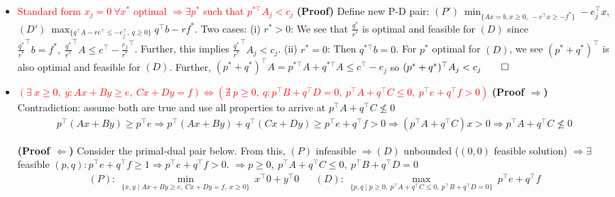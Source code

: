 \documentclass{article}
\begin{document}
\begin{itemize}
    \item \textcolor{red}{Standard form $x_j = 0\ \forall x^*$ optimal $\Rightarrow \exists p^*$ such that $p^{*\top} A_j < c_j$}
    \textbf{(Proof)} Define new P-D pair: $(P')\ \min_{\{Ax=b, x\geq0,\ -c^\top x \geq -f^*\}}-e_j^\top x$, $(D')\ \max_{\{q^\top A -rc^\top \leq -e_j^\top,\ q\geq0\}}q^\top b -rf^*$. Two cases: (i) $r^*> 0$: We see that $\tfrac{q^*}{r^*}$ is optimal and feasible for $(D)$ since $\tfrac{q^*}{r^*}^\top b = f^*,\;\tfrac{q^*}{r^*}^\top A \leq c^\top - \tfrac{e_j}{r^*}^\top$. Further, this implies $\tfrac{q^*}{r^*}^\top A_j < c_j$. (ii) $r^*=0$: Then $q^{*\top}b = 0$. For $p^*$ optimal for $(D)$, we see $(p^{*} + q^*)^\top$ is also optimal and feasible for $(D)$. Further, $(p^{*} + q^*)^\top A = p^{*\top}A + q^{*\top}A \leq c^\top - e_j$ so $(p^* + q^*)^\top A_j < c_j \qed$

    \item \textcolor{red}{$(\exists\ x\geq 0,\ y: Ax + By \geq e,\ Cx + Dy = f) \iff (\nexists\ p\geq0,\ q: p^\top B + q^\top D = 0,\ p^\top A + q^\top C \leq 0,\ p^\top e + q^\top f > 0)$}
    \textbf{(Proof $\Rightarrow$)} Contradiction: assume both are true and use all properties to arrive at $p^\top A + q^\top C \not\leq 0$
    \begin{align*}
        p^\top (Ax + By) \geq p^\top e \Longrightarrow p^\top (Ax + By) + q^\top (Cx + Dy) \geq p^\top e + q^\top f > 0 \Longrightarrow (p^\top A + q^\top C)x > 0 \Longrightarrow p^\top A + q^\top C \not\leq 0
    \end{align*}

    \textbf{(Proof $\Leftarrow$)}
    Consider the primal-dual pair below. From this, 
    $(P)$ infeasible $\Longrightarrow (D)$ unbounded ($(0,0)$ feasible solution)
    $\Longrightarrow \exists$ feasible $(p,q): p^\top e + q^\top f \geq 1 \Longrightarrow p^\top e + q^\top f > 0$. 
    $\Longrightarrow p\geq 0,\ p^\top A + q^\top C \leq 0,\ p^\top B + q^\top D = 0$
    \begin{align*}
        (P):\ \min_{\{x,y\mid Ax + By \geq e,\ Cx + Dy = f,\ x\geq 0\}}\ x^\top 0 + y^\top 0  && 
        (D):\ \max_{\{p,q\mid p\geq 0,\ p^\top A + q^\top C \leq 0,\ p^\top B + q^\top D = 0\}}\ p^\top e + q^\top f
    \end{align*}

\end{itemize} 
\end{document}
